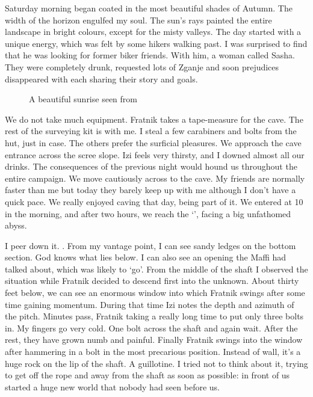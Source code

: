 Saturday morning began coated in the most beautiful shades of Autumn. The width of the horizon engulfed my soul. The sun's rays painted the entire landscape in bright colours, except for the misty valleys. The day started with a unique energy, which was felt by some hikers walking past. I was surprised to find that he was looking for former biker friends. With him, a woman called Sasha. They were completely drunk, requested lots of Zganje and soon prejudices disappeared with each sharing their story and goals.


 \begin{figure}[t!]
\checkoddpage \ifoddpage \forcerectofloat \else \forceversofloat \fi
\centering
{}
\caption{A beautiful sunrise seen from \protect{} }
\label{mig seen from kuk}
\end{figure}


We do not take much equipment. Fratnik takes a tape-measure for the cave. The rest of the surveying kit is with me. I steal a few carabiners and bolts from the hut, just in case. The others prefer the surficial pleasures. We approach the cave entrance across the scree slope. Izi feels very thirsty, and I downed almost all our drinks. The consequences of the previous night would hound us throughout the entire campaign. We move cautiously across to the cave.  My friends are normally faster than me but today they barely keep up with me although I don't have a quick pace. We really enjoyed caving that day, being part of it. We entered  at 10 in the morning, and after two hours, we reach the `', facing a big unfathomed abyss.

 I peer down it. . From my vantage point, I can see sandy ledges on the bottom section. God knows what lies below. I can also see an opening the Maffi had talked about, which was likely to `go'. From the middle of the shaft I observed the situation while Fratnik decided to descend first into the unknown. About thirty feet below, we can see an enormous window into which Fratnik swings after some time gaining momentum. During that time Izi notes the depth and azimuth of the pitch. Minutes pass, Fratnik taking a really long time to put only three bolts in. My fingers go very cold. One bolt across the shaft and again wait. After the rest, they have grown numb and painful. Finally Fratnik swings into the window after hammering in a bolt in the most precarious position. Instead of wall, it's a huge rock on the lip of the shaft. A guillotine.  I tried not to think about it, trying to get off the rope and away from the shaft as soon as possible: in front of us started a huge new world that nobody had seen before us. 

